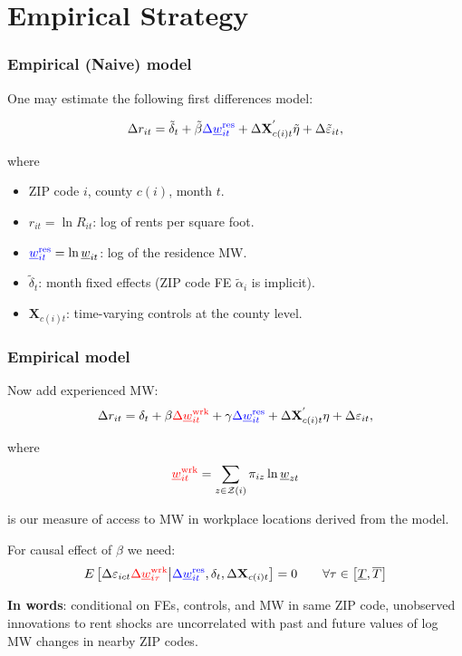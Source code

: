 \documentclass[aspectratio=169, t]{beamer}
\newcommand{\Z}{\mathcal{Z}}
\newcommand{\MW}{\underline{w}}
\begin{document}
\section{Empirical Strategy}

\begin{frame}[label = stat_only_model]
	\frametitle{Empirical (Naive) model}
	
	One may estimate the following first differences model:
	
	$$
	\Delta r_{it} = \tilde\delta_t + 
	\tilde\beta {\color{blue} \Delta \MW^{\text{res}}_{it}} + 
	\Delta \mathbf{X}^{'}_{c(i)t} \tilde\eta + 
	\Delta \tilde\varepsilon_{it} ,
	$$
	
	where	
	\begin{itemize} \small
	\item ZIP code $i$, county $c(i)$, month $t$.
	
	\item \vspace{1mm} $r_{it} = \ln R_{it}$: log of rents per square foot.
	
	\item \vspace{1mm} ${\color{blue} \MW^{\text{res}}_{it}} = \ln \MW_{it}$: log of the residence MW.
	
	\item \vspace{1mm} $\tilde\delta_t$: month fixed effects (ZIP code FE $\tilde\alpha_i 
	$ is 
	implicit).
	
	\item \vspace{.5mm} $\mathbf{X}_{c(i)t}$: time-varying controls at the county level.
	\end{itemize}
\end{frame}

\begin{frame}
	\frametitle{Empirical model}
		
	Now add experienced MW:
	$$
	\Delta r_{it} = \delta_t +
	    \beta {\color{red}\Delta \MW^{\text{wrk}}_{it}} +
		\gamma {\color{blue} \Delta \MW^{\text{res}}_{it}} + 
		\Delta \mathbf{X}^{'}_{c(i)t} \eta + 
		\Delta \varepsilon_{it} ,
	$$
	
	where 
	\[
	{\color{red} \MW^{\text{wrk}}_{it}} = 
		\sum_{z \in \Z(i)} \pi_{i z} \ln \underline{w}_{zt}
	\] 
	
	is our measure of access to MW in workplace locations derived from the model.


	\pause
	\vspace{2mm}
	For causal effect of $\beta$ we need:
	$$
	E \left[\Delta \varepsilon_{ict} {\color{red} \Delta 
	\MW^{\text{wrk}}_{i\tau}} 
	\big| {\color{blue}\Delta \MW^{\text{res}}_{it}}, \delta_t, \Delta 
	\mathbf{X}_{c(i)t} \right] = 0
	\quad \quad \forall \tau \in \left[ \underline{T}, \overline{T} \right]
	$$
	
	\pause
	\vspace{2mm}
	\textbf{In words}: conditional on FEs, controls, and {\color{blue} MW in same ZIP 
	code}, unobserved innovations to rent shocks are uncorrelated with past and future 
	values of log MW changes {\color{red} in nearby ZIP codes}.
\end{frame}
\end{document}
